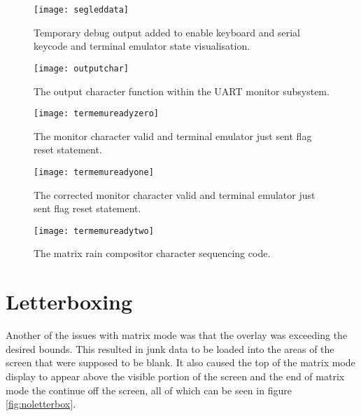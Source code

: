 \begin{figure}
  \centering
  \texttt{[image: segleddata]}
  \caption{Temporary debug output added to enable keyboard and serial keycode and terminal emulator state visualisation.}
  \label{fig:segleddata}
\end{figure}

\begin{figure}
  \centering
  \texttt{[image: outputchar]}
  \caption{The output character function within the UART monitor subsystem.}
  \label{fig:outputchar}
\end{figure}

\begin{figure}
  \centering
  \texttt{[image: termemureadyzero]}
  \caption{The monitor character valid and terminal emulator just sent flag reset statement.}
  \label{fig:termemureadyzero}
\end{figure}

\begin{figure}
  \centering
  \texttt{[image: termemureadyone]}
  \caption{The corrected monitor character valid and terminal emulator just sent flag reset statement.}
  \label{fig:termemureadyone}
\end{figure}

\begin{figure}
  \centering
  \texttt{[image: termemureadytwo]}
  \caption{The matrix rain compositor character sequencing code.}
  \label{fig:termemureadytwo}
\end{figure}


\section{Letterboxing}

\label{Ch5 Sec2}

Another of the issues with matrix mode was that the overlay was exceeding the desired bounds. This resulted in junk data to be loaded into the areas of the screen that were supposed to be blank. It also caused the top of the matrix mode display to appear above the visible portion of the screen and the end of matrix mode the continue off the screen, all of which can be seen in figure \ref{fig:noletterbox}.

